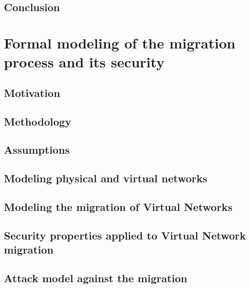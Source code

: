 \documentclass[a4paper, 11pt]{article}
\begin{document}
% 



\subsection{Conclusion}


\newpage
\section{Formal modeling of the migration process and its security}
\label{sec:formal_model}
\subsection{Motivation}


\subsection{Methodology}


\subsection{Assumptions}


\subsection{Modeling physical and virtual networks}


\subsection{Modeling the migration of Virtual Networks}


\subsection{Security properties applied to Virtual Network migration}


\subsection{Attack model against the migration}

\end{document}
